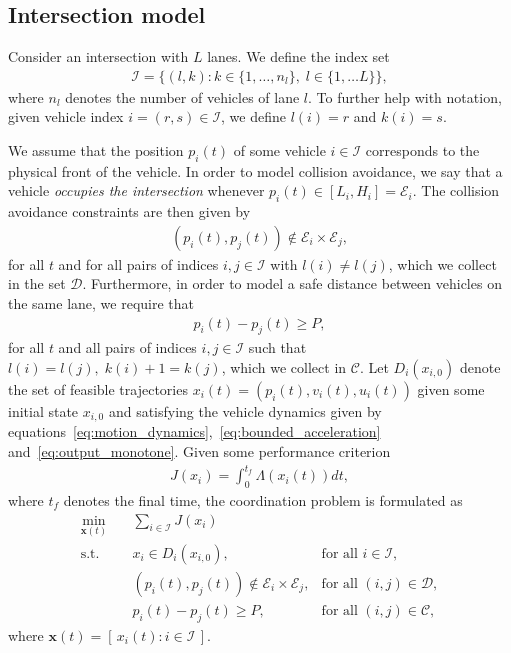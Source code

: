 \documentclass{article}
\theoremstyle{definition}
\theoremstyle{plain}
\begin{document}
\subsection*{Intersection model}

Consider an intersection with $L$ lanes. We define the index set
\begin{align}
  \mathcal{I} = \{ (l, k) : k \in \{1, \dots, n_{l}\}, \; l \in \{1, \dots L\}\} ,
\end{align}
where $n_{l}$ denotes the number of vehicles of lane $l$. To
further help with notation, given vehicle index $i = (r,s) \in \mathcal{I}$, we
define $l(i) = r$ and $k(i) = s$.

We assume that the position $p_{i}(t)$ of some vehicle $i \in \mathcal{I}$
corresponds to the physical front of the vehicle. In order to model collision
avoidance, we say that a vehicle \textit{occupies the intersection} whenever
$p_{i}(t) \in [L_{i}, H_{i}] = \mathcal{E}_{i}$. The collision avoidance
constraints are then given by
\begin{align}
  (p_{i}(t), p_{j}(t)) \notin \mathcal{E}_{i} \times \mathcal{E}_{j},
\end{align}
for all $t$ and for all pairs of indices $i, j \in \mathcal{I}$ with
$l(i) \neq l(j)$, which we collect in the set $\mathcal{D}$.
%
Furthermore, in order to model a safe distance between vehicles on the same
lane, we require that
\begin{align}
  p_{i}(t) - p_{j}(t) \geq P ,
\end{align}
for all $t$ and all pairs of indices $i, j \in \mathcal{I}$ such that
$l(i) = l(j), \; k(i) + 1 = k(j)$, which we collect in $\mathcal{C}$.
%
Let $D_{i}(x_{i,0})$ denote the set of feasible trajectories
$x_{i}(t) = (p_{i}(t), v_{i}(t), u_{i}(t))$ given some initial state $x_{i,0}$
and satisfying the vehicle dynamics given by
equations~\eqref{eq:motion_dynamics},~\eqref{eq:bounded_acceleration}
and~\eqref{eq:output_monotone}. Given some performance criterion
\begin{align}
  J(x_{i}) = \int_{0}^{t_{f}} \Lambda(x_{i}(t)) dt ,
\end{align}
where $t_{f}$ denotes the final time, the coordination problem is formulated as
\begin{subequations}\label{eq:full_problem}
\begin{align}
  \min_{\mathbf{x}(t)} \quad & \sum_{i \in \mathcal{I}} J(x_{i}) \\
  \text{s.t.} \quad  & x_{i} \in D_{i}(x_{i,0}) , &\text{for all } i \in \mathcal{I} , \\
                & (p_{i}(t), p_{j}(t))  \notin \mathcal{E}_{i} \times \mathcal{E}_{j} , &\text{for all } (i,j) \in \mathcal{D} , \\
                & p_{i}(t) - p_{j}(t) \geq P, &\text{for all } (i,j) \in \mathcal{C} ,
\end{align}
\end{subequations}
where $\mathbf{x}(t) = [\, x_{i}(t) : i \in \mathcal{I} \,]$.
\end{document}
